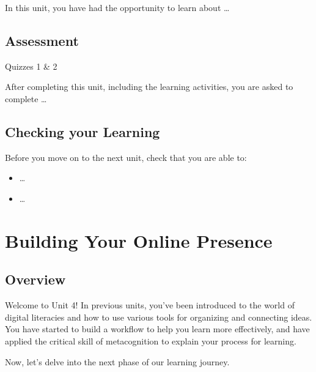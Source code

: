 \documentclass[
]{book}
\providecommand{\tightlist}{%
  \setlength{\itemsep}{0pt}\setlength{\parskip}{0pt}}
\theoremstyle{definition}
\theoremstyle{definition}
\theoremstyle{definition}
\theoremstyle{definition}
\theoremstyle{remark}
\begin{document}
In this unit, you have had the opportunity to learn about \ldots{}

\hypertarget{assessment-1}{%
\section*{Assessment}\label{assessment-1}}

\begin{assessment}
{Quizzes 1 \& 2}

After completing this unit, including the learning activities, you are asked to complete \ldots{}
\end{assessment}

\hypertarget{checking-your-learning-2}{%
\section*{Checking your Learning}\label{checking-your-learning-2}}

\begin{progress}
Before you move on to the next unit, check that you are able to:

\begin{itemize}
\tightlist
\item
  \ldots{}
\item
  \ldots{}
\end{itemize}
\end{progress}

\hypertarget{building-your-online-presence}{%
\chapter{Building Your Online Presence}\label{building-your-online-presence}}

\hypertarget{overview-3}{%
\section*{Overview}\label{overview-3}}

Welcome to Unit 4! In previous units, you've been introduced to the world of digital literacies and how to use various tools for organizing and connecting ideas. You have started to build a workflow to help you learn more effectively, and have applied the critical skill of metacognition to explain your process for learning.

Now, let's delve into the next phase of our learning journey.
\end{document}
